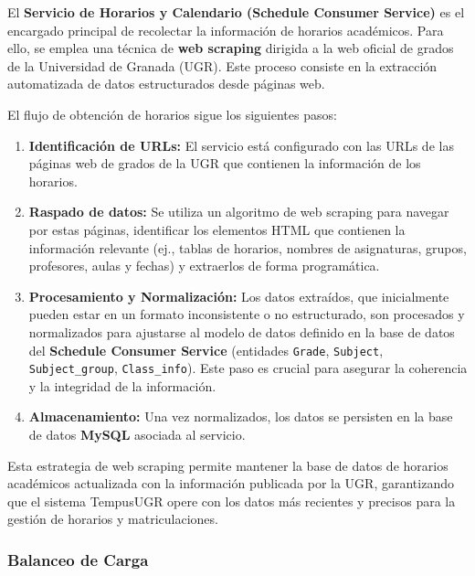 El \textbf{Servicio de Horarios y Calendario (Schedule Consumer Service)} es el encargado principal de recolectar la información de horarios académicos. Para ello, se emplea una técnica de \textbf{web scraping} dirigida a la web oficial de grados de la Universidad de Granada (UGR). Este proceso consiste en la extracción automatizada de datos estructurados desde páginas web.

El flujo de obtención de horarios sigue los siguientes pasos:
\begin{enumerate}
    \item \textbf{Identificación de URLs:} El servicio está configurado con las URLs de las páginas web de grados de la UGR que contienen la información de los horarios.
    \item \textbf{Raspado de datos:} Se utiliza un algoritmo de web scraping para navegar por estas páginas, identificar los elementos HTML que contienen la información relevante (ej., tablas de horarios, nombres de asignaturas, grupos, profesores, aulas y fechas) y extraerlos de forma programática.
    \item \textbf{Procesamiento y Normalización:} Los datos extraídos, que inicialmente pueden estar en un formato inconsistente o no estructurado, son procesados y normalizados para ajustarse al modelo de datos definido en la base de datos del \textbf{Schedule Consumer Service} (entidades \texttt{Grade}, \texttt{Subject}, \texttt{Subject\_group}, \texttt{Class\_info}). Este paso es crucial para asegurar la coherencia y la integridad de la información.
    \item \textbf{Almacenamiento:} Una vez normalizados, los datos se persisten en la base de datos \textbf{MySQL} asociada al servicio.
\end{enumerate}

Esta estrategia de web scraping permite mantener la base de datos de horarios académicos actualizada con la información publicada por la UGR, garantizando que el sistema TempusUGR opere con los datos más recientes y precisos para la gestión de horarios y matriculaciones.

\subsubsection{Balanceo de Carga}

